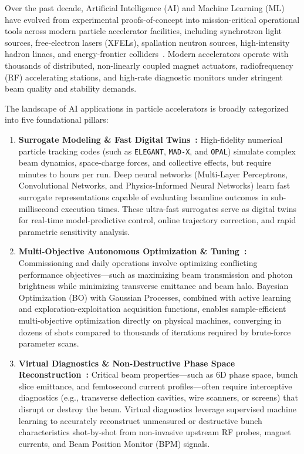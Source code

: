 \documentclass[11pt,a4paper]{article}
\begin{document}
Over the past decade, Artificial Intelligence (AI) and Machine Learning (ML) have evolved from experimental proofs-of-concept into mission-critical operational tools across modern particle accelerator facilities, including synchrotron light sources, free-electron lasers (XFELs), spallation neutron sources, high-intensity hadron linacs, and energy-frontier colliders~\cite{edelen2020opportunities}. Modern accelerators operate with thousands of distributed, non-linearly coupled magnet actuators, radiofrequency (RF) accelerating stations, and high-rate diagnostic monitors under stringent beam quality and stability demands.

The landscape of AI applications in particle accelerators is broadly categorized into five foundational pillars:
\begin{enumerate}
    \item \textbf{Surrogate Modeling \& Fast Digital Twins~\cite{edelen2020opportunities, edelen2018neural}:}
    High-fidelity numerical particle tracking codes (such as \texttt{ELEGANT}, \texttt{MAD-X}, and \texttt{OPAL}) simulate complex beam dynamics, space-charge forces, and collective effects, but require minutes to hours per run. Deep neural networks (Multi-Layer Perceptrons, Convolutional Networks, and Physics-Informed Neural Networks) learn fast surrogate representations capable of evaluating beamline outcomes in sub-millisecond execution times. These ultra-fast surrogates serve as digital twins for real-time model-predictive control, online trajectory correction, and rapid parametric sensitivity analysis.

    \item \textbf{Multi-Objective Autonomous Optimization \& Tuning~\cite{roussel2023turnkey, edelen2020machine}:}
    Commissioning and daily operations involve optimizing conflicting performance objectives---such as maximizing beam transmission and photon brightness while minimizing transverse emittance and beam halo. Bayesian Optimization (BO) with Gaussian Processes, combined with active learning and exploration-exploitation acquisition functions, enables sample-efficient multi-objective optimization directly on physical machines, converging in dozens of shots compared to thousands of iterations required by brute-force parameter scans.

    \item \textbf{Virtual Diagnostics \& Non-Destructive Phase Space Reconstruction~\cite{emma2021virtual}:}
    Critical beam properties---such as 6D phase space, bunch slice emittance, and femtosecond current profiles---often require interceptive diagnostics (e.g., transverse deflection cavities, wire scanners, or screens) that disrupt or destroy the beam. Virtual diagnostics leverage supervised machine learning to accurately reconstruct unmeasured or destructive bunch characteristics shot-by-shot from non-invasive upstream RF probes, magnet currents, and Beam Position Monitor (BPM) signals.


\end{enumerate}
\end{document}
